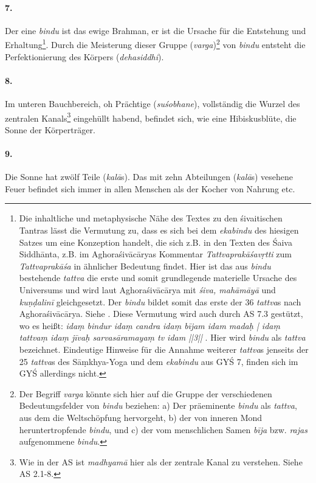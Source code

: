 \documentclass[a4paper,12pt]{article}
\begin{document}
\paragraph{7.} Der eine \textit{bindu} ist das ewige Brahman, er ist die Ursache für die Entstehung und Erhaltung\footnote{Die inhaltliche und metaphysische Nähe des Textes zu den śivaitischen Tantras lässt die Vermutung zu, dass es sich bei dem \textit{ekabindu} des hiesigen Satzes um eine Konzeption handelt, die sich z.B. in den Texten des Śaiva Siddhānta, z.B. im Aghoraśivācāryas Kommentar \textit{Tattvaprakāśavṛtti} zum \textit{Tattvaprakāśa} in ähnlicher Bedeutung findet. Hier ist das aus \textit{bindu} bestehende \textit{tattva} die erste und somit grundlegende materielle Ursache des Universums und wird laut Aghoraśivācārya mit \textit{śiva, mahāmāyā} und \textit{kuṇḍalinī} gleichgesetzt. Der \textit{bindu} bildet somit das erste der 36 \textit{tattva}s nach Aghoraśivācārya. Siehe \parencite[117, 177]{gengnagel1996}. Diese Vermutung wird auch durch AS 7.3 gestützt, wo es heißt: \textit{idaṃ bindur idaṃ candra idaṃ bījam idam madaḥ | idaṃ tattvaṃ idaṃ jīvaḥ sarvasāramayaṃ tv idam ||3||} \parencite[9]{asiddhi}. Hier wird \textit{bindu} als \textit{tattva} bezeichnet. Eindeutige Hinweise für die Annahme weiterer \textit{tattva}s jenseits der 25 \textit{tattva}s des Sāṃkhya-Yoga und dem \textit{ekabindu} aus GYŚ 7, finden sich im GYŚ allerdings nicht.}. Durch die Meisterung dieser Gruppe (\textit{varga})\footnote{Der Begriff \textit{varga} könnte sich hier auf die Gruppe der verschiedenen Bedeutungsfelder  von \textit{bindu} beziehen: a) Der präeminente \textit{bindu} als \textit{tattva}, aus dem die Weltschöpfung hervorgeht, b) der von inneren Mond heruntertropfende \textit{bindu}, und c) der vom menschlichen Samen \textit{bīja} bzw. \textit{rajas} aufgenommene \textit{bindu}.} von \textit{bindu} entsteht die Perfektionierung des Körpers (\textit{dehasiddhi}). 

\paragraph{8.} Im unteren Bauchbereich, oh Prächtige (\textit{suśobhane}), vollständig die Wurzel des zentralen Kanals\footnote{Wie in der AS ist \textit{madhyamā} hier als der zentrale Kanal zu verstehen. Siehe AS 2.1-8.} eingehüllt habend, befindet sich, wie eine Hibiskusblüte, die Sonne der Körperträger. 

\paragraph{9.} Die Sonne hat zwölf Teile (\textit{kalā}s). Das mit zehn Abteilungen (\textit{kalā}s) vesehene Feuer befindet sich immer in allen Menschen als der Kocher von Nahrung etc. 
\end{document}
